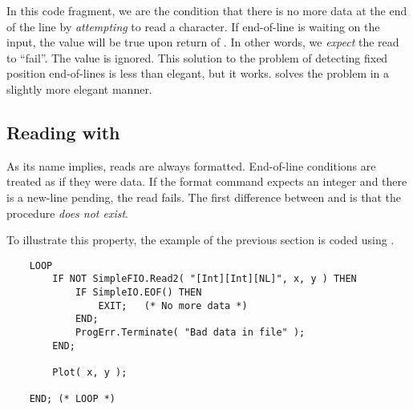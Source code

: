 In this code fragment, we are  the condition
that there is no more data at the end of the line by {\em attempting}
to read a character.  If end-of-line is waiting on the input,
the value  will be true upon return of .
In other words, we {\em expect} the read to ``fail''.  The
value  is ignored.
This solution to the problem of detecting fixed position end-of-lines is less
than elegant, but it works.  
 solves the problem in a slightly more elegant manner.


\subsection{Reading with }    
\label{ReadingWithSimpleFIO}

As its name implies,  reads are always formatted.
End-of-line conditions are treated as if they were data. 
If the format command expects an integer and there
is a new-line pending, the read fails.
The first difference between  and
 is that the procedure 
 {\em does not exist}.  

To illustrate this property, the example
of the previous section is coded using .
\begin{verbatim}
    LOOP
        IF NOT SimpleFIO.Read2( "[Int][Int][NL]", x, y ) THEN
            IF SimpleIO.EOF() THEN
                EXIT;   (* No more data *)
            END;
            ProgErr.Terminate( "Bad data in file" );
        END;
        
        Plot( x, y );

    END; (* LOOP *)
\end{verbatim}
    
